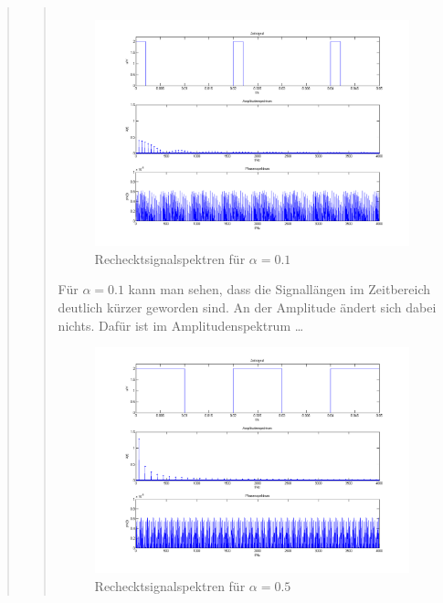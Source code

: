 \begin{quote}
\begin{quote}
\begin{center}
\begin{tabular}{|c|c|c|c|}
                 \end{tabular}
		
	           \begin{figure}[H]
    			\centering
    				\includegraphics[scale=0.5]{recht_alpha1.png}
    			\caption{Rechecktsignalspektren für $\alpha = 0.1$}
    				\end{figure}		
		\end{center}
		
		Für $\alpha = 0.1$ kann man sehen, dass die Signallängen im Zeitbereich
		deutlich kürzer geworden sind. An der Amplitude ändert sich dabei nichts.
		Dafür ist im Amplitudenspektrum \ldots
		
		\begin{center}
	           \begin{figure}[H]
    			\centering
    				\includegraphics[scale=0.5]{recht_alpha5.png}
    			\caption{Rechecktsignalspektren für $\alpha = 0.5$}		
    			\end{figure}		
    			\end{center}
		

\end{quote}
\end{quote}
